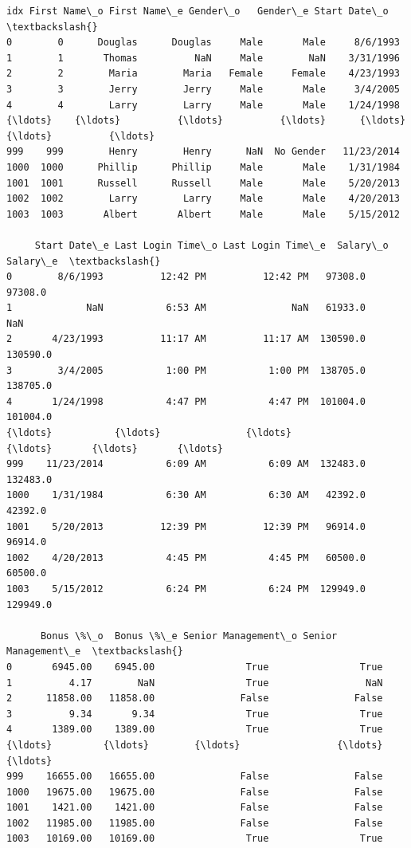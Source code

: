 \documentclass [oneside,10pt,a4paper,ngerman,BCOR10mm,headsepline,parindent,final]{scrartcl}
\makeatletter
\newcommand{\boxspacing}{\kern\kvtcb@left@rule\kern\kvtcb@boxsep}
\newcommand{\prompt}[4]{
        {\ttfamily\llap{{\color{#2}[#3]:\hspace{3pt}#4}}\vspace{-\baselineskip}}
    }
\makeatother
\begin{document}
            \begin{tcolorbox}[breakable, size=fbox, boxrule=.5pt, pad at break*=1mm, opacityfill=0]
\prompt{Out}{outcolor}{45}{\boxspacing}
\begin{Verbatim}[commandchars=\\\{\}]
       idx First Name\_o First Name\_e Gender\_o   Gender\_e Start Date\_o  \textbackslash{}
0        0      Douglas      Douglas     Male       Male     8/6/1993
1        1       Thomas          NaN     Male        NaN    3/31/1996
2        2        Maria        Maria   Female     Female    4/23/1993
3        3        Jerry        Jerry     Male       Male     3/4/2005
4        4        Larry        Larry     Male       Male    1/24/1998
{\ldots}    {\ldots}          {\ldots}          {\ldots}      {\ldots}        {\ldots}          {\ldots}
999    999        Henry        Henry      NaN  No Gender   11/23/2014
1000  1000      Phillip      Phillip     Male       Male    1/31/1984
1001  1001      Russell      Russell     Male       Male    5/20/2013
1002  1002        Larry        Larry     Male       Male    4/20/2013
1003  1003       Albert       Albert     Male       Male    5/15/2012

     Start Date\_e Last Login Time\_o Last Login Time\_e  Salary\_o  Salary\_e  \textbackslash{}
0        8/6/1993          12:42 PM          12:42 PM   97308.0   97308.0
1             NaN           6:53 AM               NaN   61933.0       NaN
2       4/23/1993          11:17 AM          11:17 AM  130590.0  130590.0
3        3/4/2005           1:00 PM           1:00 PM  138705.0  138705.0
4       1/24/1998           4:47 PM           4:47 PM  101004.0  101004.0
{\ldots}           {\ldots}               {\ldots}               {\ldots}       {\ldots}       {\ldots}
999    11/23/2014           6:09 AM           6:09 AM  132483.0  132483.0
1000    1/31/1984           6:30 AM           6:30 AM   42392.0   42392.0
1001    5/20/2013          12:39 PM          12:39 PM   96914.0   96914.0
1002    4/20/2013           4:45 PM           4:45 PM   60500.0   60500.0
1003    5/15/2012           6:24 PM           6:24 PM  129949.0  129949.0

      Bonus \%\_o  Bonus \%\_e Senior Management\_o Senior Management\_e  \textbackslash{}
0       6945.00    6945.00                True                True
1          4.17        NaN                True                 NaN
2      11858.00   11858.00               False               False
3          9.34       9.34                True                True
4       1389.00    1389.00                True                True
{\ldots}         {\ldots}        {\ldots}                 {\ldots}                 {\ldots}
999    16655.00   16655.00               False               False
1000   19675.00   19675.00               False               False
1001    1421.00    1421.00               False               False
1002   11985.00   11985.00               False               False
1003   10169.00   10169.00                True                True


\end{Verbatim}
\end{tcolorbox}
\end{document}
